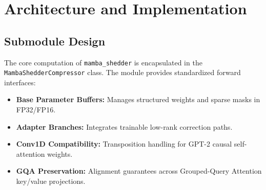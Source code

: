 \section{Architecture and Implementation}

\subsection{Submodule Design}
The core computation of \texttt{mamba_shedder} is encapsulated in the \texttt{MambaShedderCompressor} class. The module provides standardized forward interfaces:
\begin{itemize}
\item \textbf{Base Parameter Buffers:} Manages structured weights and sparse masks in FP32/FP16.
\item \textbf{Adapter Branches:} Integrates trainable low-rank correction paths.
\item \textbf{Conv1D Compatibility:} Transposition handling for GPT-2 causal self-attention weights.
\item \textbf{GQA Preservation:} Alignment guarantees across Grouped-Query Attention key/value projections.
\end{itemize}
